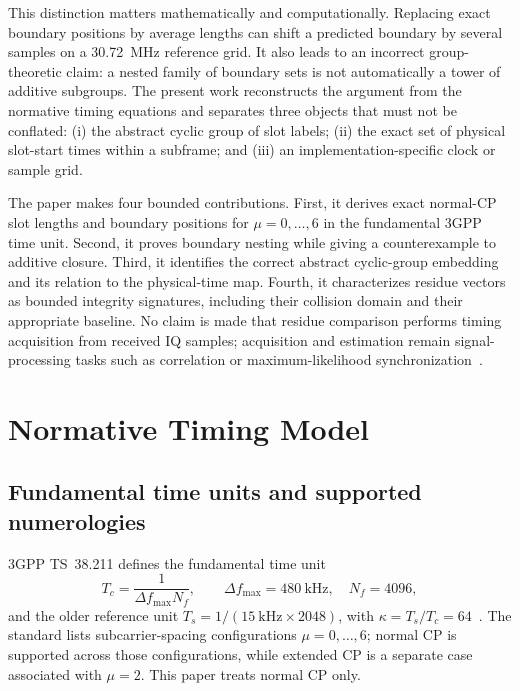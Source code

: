 \documentclass[11pt]{article}
\begin{document}
This distinction matters mathematically and computationally.  Replacing exact boundary positions by average lengths can shift a predicted boundary by several samples on a 30.72~MHz reference grid.  It also leads to an incorrect group-theoretic claim: a nested family of boundary sets is not automatically a tower of additive subgroups.  The present work reconstructs the argument from the normative timing equations and separates three objects that must not be conflated: (i) the abstract cyclic group of slot labels; (ii) the exact set of physical slot-start times within a subframe; and (iii) an implementation-specific clock or sample grid.

The paper makes four bounded contributions.  First, it derives exact normal-CP slot lengths and boundary positions for $\mu=0,\ldots,6$ in the fundamental 3GPP time unit.  Second, it proves boundary nesting while giving a counterexample to additive closure.  Third, it identifies the correct abstract cyclic-group embedding and its relation to the physical-time map.  Fourth, it characterizes residue vectors as bounded integrity signatures, including their collision domain and their appropriate baseline.  No claim is made that residue comparison performs timing acquisition from received IQ samples; acquisition and estimation remain signal-processing tasks such as correlation or maximum-likelihood synchronization~\cite{schmidl1997,vandebeek1997}.

\section{Normative Timing Model}

\subsection{Fundamental time units and supported numerologies}

3GPP TS~38.211 defines the fundamental time unit
\begin{equation}
    T_c = \frac{1}{\Delta f_{\max}N_f},
    \qquad \Delta f_{\max}=480\ \text{kHz},\quad N_f=4096,
    \label{eq:tc}
\end{equation}
and the older reference unit $T_s=1/(15\ \text{kHz}\times 2048)$, with $\kappa=T_s/T_c=64$~\cite{etsi38211}.  The standard lists subcarrier-spacing configurations $\mu=0,\ldots,6$; normal CP is supported across those configurations, while extended CP is a separate case associated with $\mu=2$.  This paper treats normal CP only.
\end{document}
